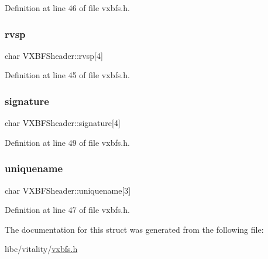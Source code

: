 Definition at line 46 of file vxbfs.\+h.

\mbox{\label{a00330_aad660a962d04482ff03bce38000c1a37_aad660a962d04482ff03bce38000c1a37}} 
\subsubsection{\texorpdfstring{rvsp}{rvsp}}
{\footnotesize\ttfamily char V\+X\+B\+F\+Sheader\+::rvsp\mbox{[}4\mbox{]}}



Definition at line 45 of file vxbfs.\+h.

\mbox{\label{a00330_a4c82fb69a08f04d22d832e030cc71577_a4c82fb69a08f04d22d832e030cc71577}} 
\subsubsection{\texorpdfstring{signature}{signature}}
{\footnotesize\ttfamily char V\+X\+B\+F\+Sheader\+::signature\mbox{[}4\mbox{]}}



Definition at line 49 of file vxbfs.\+h.

\mbox{\label{a00330_af0310ee852d6ec20fe68052fff0d1378_af0310ee852d6ec20fe68052fff0d1378}} 
\subsubsection{\texorpdfstring{uniquename}{uniquename}}
{\footnotesize\ttfamily char V\+X\+B\+F\+Sheader\+::uniquename\mbox{[}3\mbox{]}}



Definition at line 47 of file vxbfs.\+h.



The documentation for this struct was generated from the following file\+:\begin{DoxyCompactItemize}
\item 
libc/vitality/\hyperlink{a00200}{vxbfs.\+h}\end{DoxyCompactItemize}
